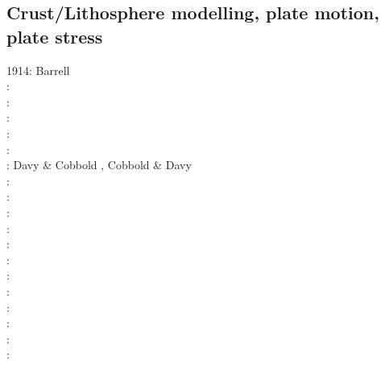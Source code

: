 \subsection{Crust/Lithosphere modelling, plate motion, plate stress}

\begin{scriptsize}
1914: Barrell \cite{barr14}\\
\nineteenseventyseven: \cite{crou77}\\
\nineteeneightyone: \cite{brpo81}\\
\nineteeneightythree: \cite{mcja83}\\
\nineteeneightyfour: \cite{kupa84}\cite{riff84}\\
\nineteeneightysix: \cite{stbb86}\\
\nineteeneightyeight: Davy \& Cobbold \cite{daco88}, Cobbold \& Davy \cite{coda88}\\
\nineteeneightynine: \cite{jabe89}\\
\nineteenninety: \cite{chmo90}\\
\nineteenninetyone: \cite{chbv91}\cite{daco91}\\
\nineteenninetytwo: \cite{moln92}\cite{budi92}\cite{kigw92}\\
\nineteenninetythree: \cite{nefo93}\cite{brau93}\cite{grma93}\cite{berc93}\\
\nineteenninetyfour: \cite{buso94}\cite{befh94}\\
\nineteenninetyfive: \cite{belg95}\cite{brbe95}\cite{kian95}\cite{budi95}\cite{elfb95}\cite{zhgu95b}\\
\nineteenninetysix: \cite{bekh96}\cite{berc96}\cite{jabh96}\\
\nineteenninetyseven: \cite{thsj97}\cite{babr97}\cite{bucl97}\cite{mole97}\\
\nineteenninetyeight: \cite{bird98}\cite{lecd98}\cite{kian98}\cite{mafs98}\cite{madu98}\cite{gumm98}\cite{berc98}\cite{madu98}\\
\nineteenninetynine: \cite{will99b}\cite{bird99}\cite{clbp99}\cite{fugo99}\cite{mole99}\cite{lemo99}\cite{gebp99}\\
\twothousand: \cite{hanl00}\cite{labp00}\cite{lemm00}\cite{gumm00}\cite{lemo00}\cite{pepo00}\cite{scys00b}\\

\end{scriptsize}

